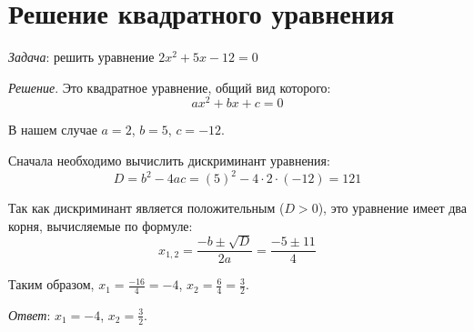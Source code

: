 \documentclass[12pt]{article}
\begin{document}
\section{Решение квадратного уравнения}

\textit{Задача}: решить уравнение $2x^2 + 5x - 12 = 0$

\textit{Решение}. Это квадратное уравнение, общий вид которого:
\[ ax^2 + bx + c = 0 \]

В нашем случае $a = 2$, $b = 5$, $c = -12$.

Сначала необходимо вычислить дискриминант уравнения:
\[ D = b^2 - 4ac = (5)^2 - 4 \cdot 2 \cdot (-12) = 121 \]

Так как дискриминант является положительным ($D > 0$), это уравнение
имеет два корня, вычисляемые по формуле:
\[ x_{1,2} = \frac{-b \pm \sqrt{D}}{2a} = \frac{-5 \pm 11}{4} \]

Таким образом, $x_1 = \frac{-16}{4} = -4$, $x_2 = \frac{6}{4} = \frac{3}{2}$.

\textit{Ответ}: $x_1 = -4$, $x_2 = \frac{3}{2}$.
\end{document}
